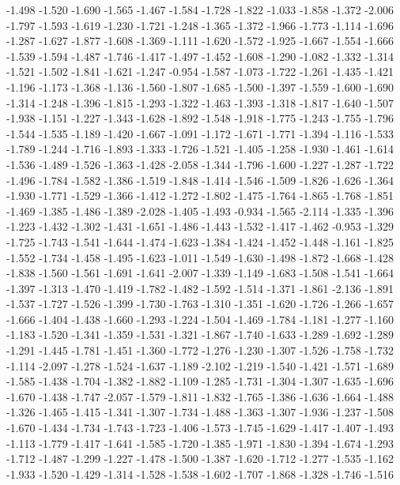 \documentclass[9pt]{article}
\theoremstyle{plain}
\theoremstyle{definition}
\theoremstyle{remark}
\numberwithin{equation}{section}
\begin{document}
-1.498
-1.520
-1.690
-1.565
-1.467
-1.584
-1.728
-1.822
-1.033
-1.858
-1.372
-2.006
-1.797
-1.593
-1.619
-1.230
-1.721
-1.248
-1.365
-1.372
-1.966
-1.773
-1.114
-1.696
-1.287
-1.627
-1.877
-1.608
-1.369
-1.111
-1.620
-1.572
-1.925
-1.667
-1.554
-1.666
-1.539
-1.594
-1.487
-1.746
-1.417
-1.497
-1.452
-1.608
-1.290
-1.082
-1.332
-1.314
-1.521
-1.502
-1.841
-1.621
-1.247
-0.954
-1.587
-1.073
-1.722
-1.261
-1.435
-1.421
-1.196
-1.173
-1.368
-1.136
-1.560
-1.807
-1.685
-1.500
-1.397
-1.559
-1.600
-1.690
-1.314
-1.248
-1.396
-1.815
-1.293
-1.322
-1.463
-1.393
-1.318
-1.817
-1.640
-1.507
-1.938
-1.151
-1.227
-1.343
-1.628
-1.892
-1.548
-1.918
-1.775
-1.243
-1.755
-1.796
-1.544
-1.535
-1.189
-1.420
-1.667
-1.091
-1.172
-1.671
-1.771
-1.394
-1.116
-1.533
-1.789
-1.244
-1.716
-1.893
-1.333
-1.726
-1.521
-1.405
-1.258
-1.930
-1.461
-1.614
-1.536
-1.489
-1.526
-1.363
-1.428
-2.058
-1.344
-1.796
-1.600
-1.227
-1.287
-1.722
-1.496
-1.784
-1.582
-1.386
-1.519
-1.848
-1.414
-1.546
-1.509
-1.826
-1.626
-1.364
-1.930
-1.771
-1.529
-1.366
-1.412
-1.272
-1.802
-1.475
-1.764
-1.865
-1.768
-1.851
-1.469
-1.385
-1.486
-1.389
-2.028
-1.405
-1.493
-0.934
-1.565
-2.114
-1.335
-1.396
-1.223
-1.432
-1.302
-1.431
-1.651
-1.486
-1.443
-1.532
-1.417
-1.462
-0.953
-1.329
-1.725
-1.743
-1.541
-1.644
-1.474
-1.623
-1.384
-1.424
-1.452
-1.448
-1.161
-1.825
-1.552
-1.734
-1.458
-1.495
-1.623
-1.011
-1.549
-1.630
-1.498
-1.872
-1.668
-1.428
-1.838
-1.560
-1.561
-1.691
-1.641
-2.007
-1.339
-1.149
-1.683
-1.508
-1.541
-1.664
-1.397
-1.313
-1.470
-1.419
-1.782
-1.482
-1.592
-1.514
-1.371
-1.861
-2.136
-1.891
-1.537
-1.727
-1.526
-1.399
-1.730
-1.763
-1.310
-1.351
-1.620
-1.726
-1.266
-1.657
-1.666
-1.404
-1.438
-1.660
-1.293
-1.224
-1.504
-1.469
-1.784
-1.181
-1.277
-1.160
-1.183
-1.520
-1.341
-1.359
-1.531
-1.321
-1.867
-1.740
-1.633
-1.289
-1.692
-1.289
-1.291
-1.445
-1.781
-1.451
-1.360
-1.772
-1.276
-1.230
-1.307
-1.526
-1.758
-1.732
-1.114
-2.097
-1.278
-1.524
-1.637
-1.189
-2.102
-1.219
-1.540
-1.421
-1.571
-1.689
-1.585
-1.438
-1.704
-1.382
-1.882
-1.109
-1.285
-1.731
-1.304
-1.307
-1.635
-1.696
-1.670
-1.438
-1.747
-2.057
-1.579
-1.811
-1.832
-1.765
-1.386
-1.636
-1.664
-1.488
-1.326
-1.465
-1.415
-1.341
-1.307
-1.734
-1.488
-1.363
-1.307
-1.936
-1.237
-1.508
-1.670
-1.434
-1.734
-1.743
-1.723
-1.406
-1.573
-1.745
-1.629
-1.417
-1.407
-1.493
-1.113
-1.779
-1.417
-1.641
-1.585
-1.720
-1.385
-1.971
-1.830
-1.394
-1.674
-1.293
-1.712
-1.487
-1.299
-1.227
-1.478
-1.500
-1.387
-1.620
-1.712
-1.277
-1.535
-1.162
-1.933
-1.520
-1.429
-1.314
-1.528
-1.538
-1.602
-1.707
-1.868
-1.328
-1.746
-1.516
\end{document}
